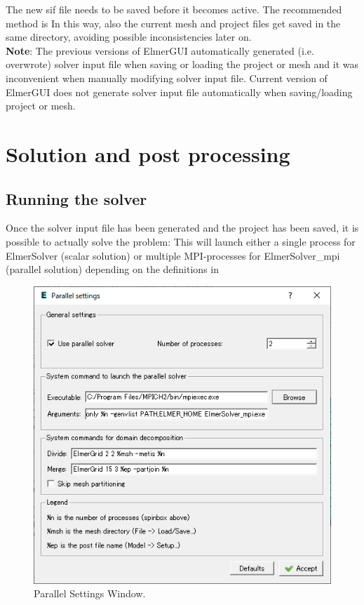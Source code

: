 \noindent The new sif file needs to be saved before it becomes active. The recommended
method is
\noindent In this way, also the current mesh and project files get saved in the
same directory, avoiding possible inconsistencies later on.
\vspace{3mm}\\
{\bf Note}: The previous versions of ElmerGUI automatically generated (i.e. overwrote) solver input file when saving or loading the project or mesh and it was inconvenient when manually modifying solver input file. Current version of ElmerGUI does not generate solver input file automatically when saving/loading project or mesh.

\chapter{Solution and post processing}

\section{Running the solver}

Once the solver input file has been generated and the project has been saved,
it is possible to actually solve the problem:
\noindent This will launch either a single process for ElmerSolver (scalar solution)
or multiple MPI-processes for ElmerSolver\_mpi (parallel solution) depending on the
definitions in


\begin{figure}[htb]
\begin{center}
 \includegraphics[scale=0.5]{images/parallelsettings.png}
\caption{Parallel Settings Window.}
\label{fig:parallelsettings}
\end{center}
\end{figure}

